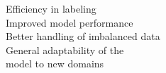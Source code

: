 \documentclass[preview]{standalone}
\begin{document}
Efficiency in labeling\\Improved model performance\\Better handling of imbalanced data\\General adaptability of the \\model to new domains\\
\end{document}
